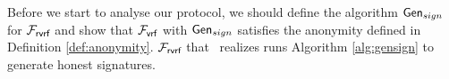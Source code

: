 %		
%	
%	
%

Before we start to analyse our protocol, we should define the algorithm $ \mathsf{Gen}_{sign} $  for $ \mathcal{F}_{\textsf{rvrf}} $ and show that $ \mathcal{F}_{\textsf{vrf}} $ with $ \mathsf{Gen}_{sign} $ satisfies the anonymity defined in Definition \ref{def:anonymity}. $ \mathcal{F}_{\textsf{rvrf}} $ that \name \ realizes runs  Algorithm \ref{alg:gensign} to generate honest signatures.



%	

